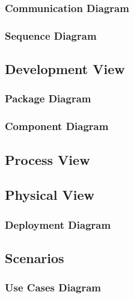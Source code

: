 \documentclass[12pt]{article}
\begin{document}
	\subsubsection{Communication Diagram}



	\subsubsection {Sequence Diagram}



	\subsection{Development View}



	\subsubsection{Package Diagram}



	\subsubsection{Component Diagram}



	\subsection{Process View}



	\subsection {Physical View}


	
	\subsubsection{Deployment Diagram}



	\subsection{Scenarios}

	\subsubsection{Use Cases Diagram}
\end{document}
